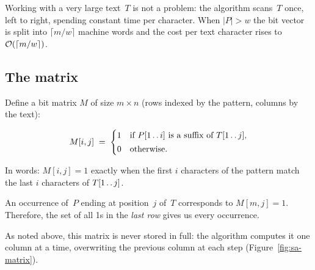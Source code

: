 Working with a very large text~$T$ is not a problem: the algorithm scans~$T$
once, left to right, spending constant time per character.
When $|P| > w$ the bit vector is split into $\lceil m/w \rceil$ machine words
and the cost per text character rises to $\mathcal{O}\!\left(\lceil m/w \rceil\right)$.

\subsection{The matrix}

Define a bit matrix $M$ of size $m \times n$ (rows indexed by the pattern,
columns by the text):

\begin{definition}
\label{def:sa-matrix}
  \[
    M[i,j] \;=\;
    \begin{cases}
      1 & \text{if } P[1 \mathinner{.\,.} i]
          \text{ is a suffix of } T[1 \mathinner{.\,.} j],\\[2pt]
      0 & \text{otherwise.}
    \end{cases}
  \]
\end{definition}

In words: $M[i,j] = 1$ exactly when the first $i$ characters of the pattern
match the last $i$ characters of $T[1 \mathinner{.\,.} j]$.

\begin{observation}
  An occurrence of~$P$ ending at position~$j$ of~$T$ corresponds to
  $M[m,j] = 1$.  Therefore, the set of all 1s in the \emph{last row} gives us
  every occurrence.
\end{observation}


As noted above, this matrix is never stored in full: the algorithm computes it
one column at a time, overwriting the previous column at each step
(Figure~\ref{fig:sa-matrix}).

